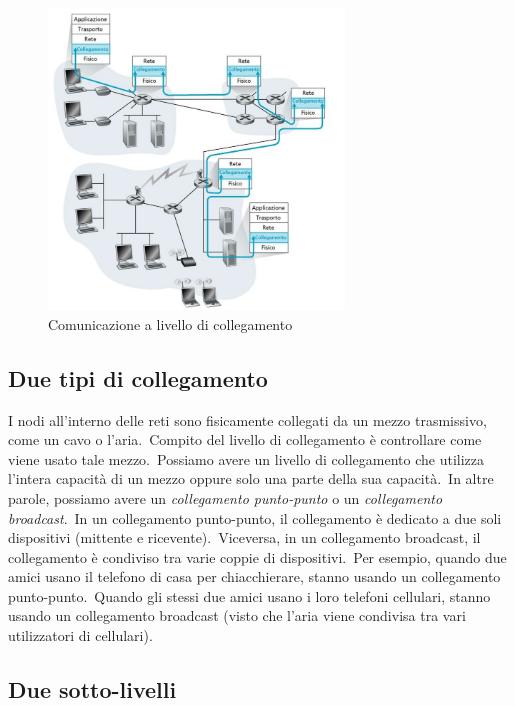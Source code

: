 \begin{figure}[H]
    \centering
    \includegraphics[width=0.7\textwidth]{immagini/Livello_Collegamento.jpg}
    \caption*{Comunicazione a livello di collegamento}
\end{figure}

\subsection{Due tipi di collegamento}

I nodi all'interno delle reti sono fisicamente collegati da un mezzo trasmissivo, come un cavo o l'aria.\
Compito del livello di collegamento è controllare come viene usato tale mezzo.\
Possiamo avere un livello di collegamento che utilizza l'intera capacità di un mezzo oppure solo una parte della sua capacità.\
In altre parole, possiamo avere un \emph{collegamento punto-punto} o un \emph{collegamento broadcast}.\
In un collegamento punto-punto, il collegamento è dedicato a due soli dispositivi (mittente e ricevente).\
Viceversa, in un collegamento broadcast, il collegamento è condiviso tra varie coppie di dispositivi.\
Per esempio, quando due amici usano il telefono di casa per chiacchierare, stanno usando un collegamento punto-punto.\
Quando gli stessi due amici usano i loro telefoni cellulari, stanno usando un collegamento broadcast (visto che l'aria viene condivisa tra vari utilizzatori di cellulari).

\subsection{Due sotto-livelli}

